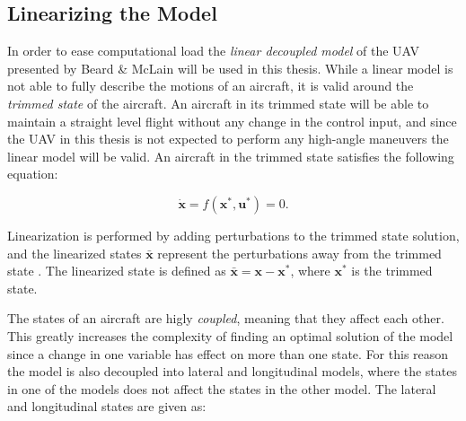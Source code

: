 \subsection{Linearizing the Model}

In order to ease computational load the \textit{linear decoupled model} of the UAV presented by Beard \& McLain \cite{uavBEARD} will be used in this thesis. While a linear model is not able to fully describe the motions of an aircraft, it is valid around the \textit{trimmed state} of the aircraft. An aircraft in its trimmed state will be able to maintain a straight level flight without any change in the control input, and since the UAV in this thesis is not expected to perform any high-angle maneuvers the linear model will be valid. An aircraft in the trimmed state satisfies the following equation:

\begin{equation}
	\mathbf{\dot{x}} = f(\mathbf{x}^*, \mathbf{u}^*) = 0.
\end{equation}

Linearization is performed by adding perturbations to the trimmed state solution, and the linearized states $\mathbf{\bar{x}}$ represent the perturbations away from the trimmed state \cite{modsimEGELAND}. The linearized state is defined as $\mathbf{\bar{x}} = \mathbf{x} - \mathbf{x}^*$, where $\mathbf{x}^*$ is the trimmed state.

The states of an aircraft are higly \textit{coupled}, meaning that they affect each other. This greatly increases the complexity of finding an optimal solution of the model since a change in one variable has effect on more than one state. For this reason the model is also decoupled into lateral and longitudinal models, where the states in one of the models does not affect the states in the other model. The lateral and longitudinal states are given as:

